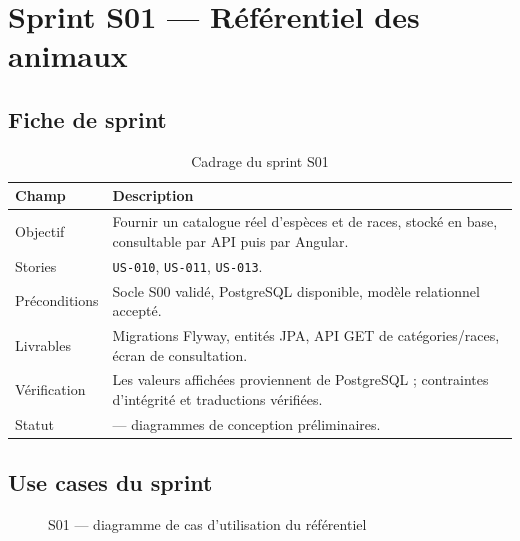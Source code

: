 \chapter{Sprint S01 --- Référentiel des animaux}\label{ch:s01}
\section{Fiche de sprint}
\begin{table}[htbp]\centering\small
\caption{Cadrage du sprint S01}
\begin{tabularx}{\textwidth}{@{}P{31mm}Y@{}}\toprule
\textbf{Champ} & \textbf{Description}\\\midrule
Objectif & Fournir un catalogue réel d’espèces et de races, stocké en base, consultable par API puis par Angular.\\
Stories & \texttt{US-010}, \texttt{US-011}, \texttt{US-013}.\\
Préconditions & Socle S00 validé, PostgreSQL disponible, modèle relationnel accepté.\\
Livrables & Migrations Flyway, entités JPA, API GET de catégories/races, écran de consultation.\\
Vérification & Les valeurs affichées proviennent de PostgreSQL ; contraintes d’intégrité et traductions vérifiées.\\
Statut &  --- diagrammes de conception préliminaires.\\
\bottomrule\end{tabularx}\end{table}

\section{Use cases du sprint}
\begin{figure}[H]\centering
\caption{S01 --- diagramme de cas d’utilisation du référentiel}\label{fig:s01-uc}\end{figure}

